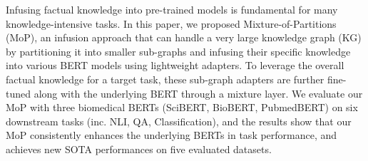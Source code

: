 Infusing factual knowledge into pre-trained models is fundamental for many knowledge-intensive tasks. In this paper, we proposed Mixture-of-Partitions (MoP), an infusion approach that can handle a very large knowledge graph (KG) by partitioning it into smaller sub-graphs and infusing their specific knowledge into various BERT models using lightweight adapters. To leverage the overall factual knowledge for a target task, these sub-graph adapters are further fine-tuned along with the underlying BERT through a mixture layer. We evaluate our MoP with three biomedical BERTs (SciBERT, BioBERT, PubmedBERT) on six downstream tasks (inc. NLI, QA, Classification), and the results show that our MoP consistently enhances the underlying BERTs in task performance, and achieves new SOTA performances on five evaluated datasets.
